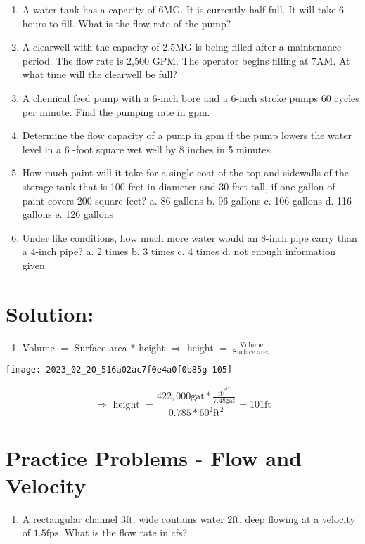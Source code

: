 \documentclass[10pt]{article}
\begin{document}
\begin{enumerate}
\begin{enumerate}
\begin{enumerate}
  \item A water tank has a capacity of 6MG. It is currently half full. It will take 6 hours to fill. What is the flow rate of the pump?

  \item A clearwell with the capacity of $2.5 \mathrm{MG}$ is being filled after a maintenance period. The flow rate is 2,500 GPM. The operator begins filling at $7 \mathrm{AM}$. At what time will the clearwell be full?

  \item A chemical feed pump with a 6-inch bore and a 6-inch stroke pumps 60 cycles per minute. Find the pumping rate in gpm.

  \item Determine the flow capacity of a pump in gpm if the pump lowers the water level in a 6 -foot square wet well by 8 inches in 5 minutes.

  \item How much paint will it take for a single coat of the top and sidewalls of the storage tank that is 100-feet in diameter and 30-feet tall, if one gallon of paint covers 200 square feet?
a. 86 gallons
b. 96 gallons
c. 106 gallons
d. 116 gallons
e. 126 gallons

  \item Under like conditions, how much more water would an 8-inch pipe carry than a 4-inch pipe?
a. 2 times
b. 3 times
c. 4 times
d. not enough information given

\end{enumerate}

\section{Solution:}
\begin{enumerate}
  \item Volume $=$ Surface area $*$ height $\Longrightarrow$ height $=\frac{\text { Volume }}{\text { Surface area }}$
\end{enumerate}

\begin{center}
\texttt{[image: 2023\_02\_20\_516a02ac7f0e4a0f0b85g-105]}
\end{center}

$$
\Longrightarrow \text { height }=\frac{422,000 \mathrm{gat} * \frac{\mathrm{ft}^{f^{\mathrm{ft}^{\mathrm{tt}}}}}{7.48 \mathrm{gat}}}{0.785 * 60^{2} \mathrm{ft}^{2}}=101 \mathrm{ft}
$$

\section{Practice Problems - Flow and Velocity}
\begin{enumerate}
  \item A rectangular channel $3 \mathrm{ft}$. wide contains water $2 \mathrm{ft}$. deep flowing at a velocity of $1.5 \mathrm{fps}$. What is the flow rate in cfs?


\end{enumerate}
\end{enumerate}
\end{enumerate}
\end{document}
